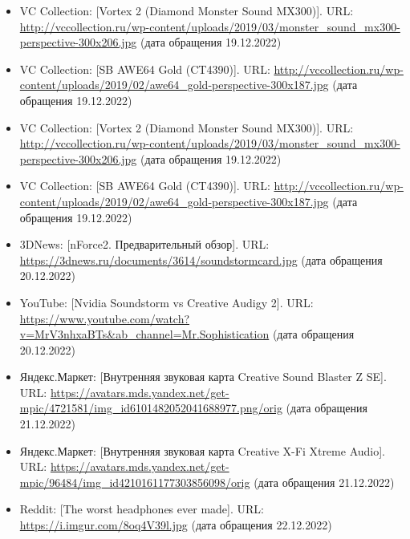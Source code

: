 \documentclass[a4paper,12pt]{extarticle}
\begin{document}
\begin{enumerate}[label=\textbf{\arabic*}]
\begin{itemize}
			\item VC Collection: [Vortex 2 (Diamond Monster Sound MX300)]. URL: \url{http://vccollection.ru/wp-content/uploads/2019/03/monster_sound_mx300-perspective-300x206.jpg} (дата обращения 19.12.2022)
			\item VC Collection: [SB AWE64 Gold (CT4390)]. URL: \url{http://vccollection.ru/wp-content/uploads/2019/02/awe64_gold-perspective-300x187.jpg} (дата обращения 19.12.2022)
			
			\item VC Collection: [Vortex 2 (Diamond Monster Sound MX300)]. URL: \url{http://vccollection.ru/wp-content/uploads/2019/03/monster_sound_mx300-perspective-300x206.jpg} (дата обращения 19.12.2022)
			\item VC Collection: [SB AWE64 Gold (CT4390)]. URL: \url{http://vccollection.ru/wp-content/uploads/2019/02/awe64_gold-perspective-300x187.jpg} (дата обращения 19.12.2022)
			
			\item 3DNews: [nForce2. Предварительный обзор]. URL: \url{https://3dnews.ru/documents/3614/soundstormcard.jpg} (дата обращения 20.12.2022)
			\item YouTube: [Nvidia Soundstorm vs Creative Audigy 2]. URL: \url{https://www.youtube.com/watch?v=MrV3nhxaBTs&ab_channel=Mr.Sophistication} (дата обращения 20.12.2022)
			
			\item Яндекс.Маркет: [Внутренняя звуковая карта Creative Sound Blaster Z SE]. URL: \url{https://avatars.mds.yandex.net/get-mpic/4721581/img_id6101482052041688977.png/orig} (дата обращения 21.12.2022)
			\item Яндекс.Маркет: [Внутренняя звуковая карта Creative X-Fi Xtreme Audio]. URL: \url{https://avatars.mds.yandex.net/get-mpic/96484/img_id4210161177303856098/orig} (дата обращения 21.12.2022)
			
			\item Reddit: [The worst headphones ever made]. URL: \url{https://i.imgur.com/8oq4V39l.jpg} (дата обращения 22.12.2022)
		\end{itemize}
	\end{enumerate}
\end{document}

